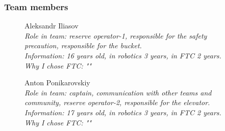 \subsubsection{Team members}
\begin{figure}[H]
	\begin{minipage}[h]{0.47\linewidth}
	\end{minipage}
	\hfill
	\begin{minipage}[h]{0.47\linewidth}
		Aleksandr Iliasov \\
		\emph{Role in team: reserve operator-1, responsible for the safety precaution, responsible for the bucket.\\}
		\emph{Information: 16 years old, in robotics 3 years, in FTC 2 years. \\}
		\emph{Why I chose FTC: ""}		
	\end{minipage}
	\vfill 
	\begin{minipage}[h]{0.47\linewidth}
		Anton Ponikarovskiy\\
		\emph{Role in team: captain, communication with other teams and community, reserve operator-2, responsible for the elevator. \\  }
		\emph{Information: 17 years old, in robotics 3 years, in FTC 2 years. \\}
		\emph{Why I chose FTC: ""}					
	\end{minipage}
	\hfill
	\begin{minipage}[h]{0.47\linewidth}
		\\

\end{minipage}
\end{figure}
